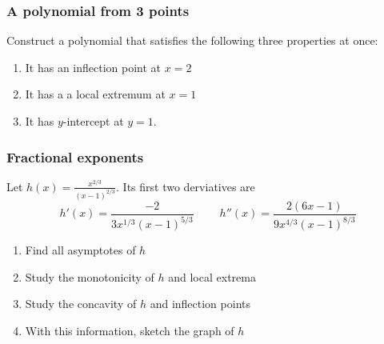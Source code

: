 \documentclass[14pt]{beamer}
\begin{document}
	\begin{frame}[t]
		\frametitle{A polynomial from 3 points}

		Construct a polynomial that satisfies the following three properties at once:
		\begin{enumerate}
			\item It has an inflection point at $x=2$

			\item It has a a local extremum at $x=1$

			\item It has $y$-intercept at $y=1$.
		\end{enumerate}
	\end{frame}
	\begin{frame}[t]
		\frametitle{Fractional exponents}

		Let ${\displaystyle h(x) = \frac{x^{2/3}}{(x-1)^{2/3}}}$. Its first two derviatives
		are
		\begin{equation*}
			h'(x) = \frac{-2}{3x^{1/3}(x-1)^{5/3}}\; \quad \quad h''(x) = \frac{2(6x-1)}{9x^{4/3}(x-1)^{8/3}}
		\end{equation*}

		\begin{enumerate}
			\item Find all asymptotes of $h$

			\item Study the monotonicity of $h$ and local extrema

			\item Study the concavity of $h$ and inflection points

			\item With this information, sketch the graph of $h$
		\end{enumerate}
	\end{frame}
\end{document}
